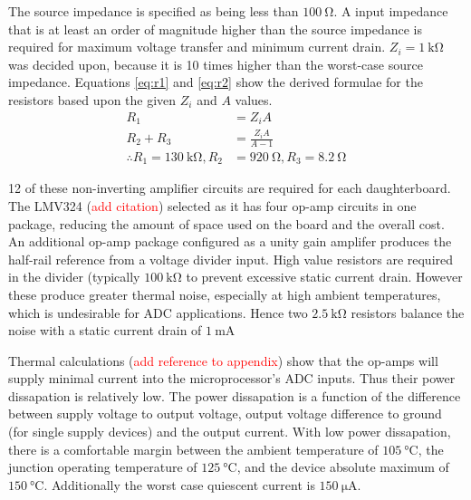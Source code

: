 The source impedance is specified as being less than $\SI{100}{\ohm}$.
A input impedance that is at least an order of magnitude higher than the source impedance is required for maximum voltage transfer and minimum current drain.
$Z_i = \SI{1}{\kilo\ohm}$ was decided upon, because it is 10 times higher than the worst-case source impedance.
Equations \ref{eq:r1} and \ref{eq:r2} show the derived formulae for the resistors based upon the given $Z_i$ and $A$ values.
\begin{align}
	R_1 &= Z_i A \label{eq:r1} \\
	R_2 + R_3 &= \frac{Z_i A}{A - 1} \label{eq:r2} \\[1em]
	\therefore R_1 = \SI{130}{\kilo\ohm}, R_2 &= \SI{920}{\ohm}, R_3 = \SI{8.2}{\ohm} \nonumber
\end{align}

12 of these non-inverting amplifier circuits are required for each daughterboard.
The LMV324 (\textcolor{red}{add citation}) selected as it has four op-amp circuits in one package, reducing the amount of space used on the board and the overall cost.
An additional op-amp package configured as a unity gain amplifer produces the half-rail reference from a voltage divider input.
High value resistors are required in the divider (typically $\SI{100}{\kilo\ohm}$ to prevent excessive static current drain.
However these produce greater thermal noise, especially at high ambient temperatures, which is undesirable for ADC applications.
Hence two $\SI{2.5}{\kilo\ohm}$ resistors balance the noise with a static current drain of $\SI{1}{\milli\ampere}$

Thermal calculations (\textcolor{red}{add reference to appendix}) show that the op-amps will supply minimal current into the microprocessor's ADC inputs.
Thus their power dissapation is relatively low.
The power dissapation is a function of the difference between supply voltage to output voltage, output voltage difference to ground (for single supply devices) and the output current.
With low power dissapation, there is a comfortable margin between the ambient temperature of $\SI{105}{\degreeCelsius}$, the junction operating temperature of $\SI{125}{\degreeCelsius}$, and the device absolute maximum of $\SI{150}{\degreeCelsius}$.
Additionally the worst case quiescent current is $\SI{150}{\micro\ampere}$.
